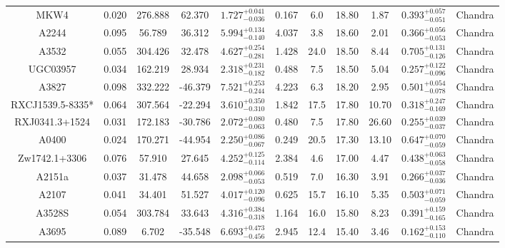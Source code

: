 \documentclass{aa}   %
\begin{document}
\begin{table}[h!]
\begin{center}
\begin{tabular}{ c  c  c  c c c c c c c c }
MKW4                		&		0.020	&	276.888	&	62.370	& $	1.727^{+0.041}_{-0.036}$  &      0.167	&  6.0	&	18.80	&	1.87	&	$ 0.393^{+0.057}_{-0.051}  $ &	  Chandra     \\
A2244               		&		0.095	&	56.789	&	36.312	& $	5.994^{+0.134}_{-0.140}$  &      4.037	&  3.8	&	18.60	&	2.01	&	$ 0.366^{+0.056}_{-0.053}  $ &	  Chandra     \\
A3532               		&		0.055	&	304.426	&	32.478	& $	4.627^{+0.254}_{-0.281}$  &      1.428	&  24.0	&	18.50	&	8.44	&	$ 0.705^{+0.131}_{-0.126}  $ &	 Chandra      \\
UGC03957            		&		0.034	&	162.219	&	28.934	& $	2.318^{+0.231}_{-0.182}$  &      0.488	&  7.5	&	18.50	&	5.04	&	$ 0.257^{+0.122}_{-0.096}  $ &	  Chandra     \\
A3827               		&		0.098	&	332.222	&	-46.379	& $	7.521^{+0.253}_{-0.244}$  &      4.223	&  6.3	&	18.20	&	2.95	&	$ 0.501^{+0.054}_{-0.078}  $ &	  Chandra     \\
RXCJ1539.5-8335*    		&		0.064	&	307.564	&	-22.294	& $	3.610^{+0.350}_{-0.310}$  &      1.842	&  17.5	&	17.80	&	10.70	&	$ 0.318^{+0.247}_{-0.169}  $ &	 Chandra      \\
RXJ0341.3+1524      		&		0.031	&	172.183	&	-30.786	& $	2.072^{+0.080}_{-0.063}$  &      0.480	&  7.5	&	17.80	&	26.60	&	$ 0.255^{+0.039}_{-0.037}  $ &	 Chandra      \\
A0400               		&		0.024	&	170.271	&	-44.954	& $	2.250^{+0.086}_{-0.067}$  &      0.249	&  20.5	&	17.30	&	13.10	&	$ 0.647^{+0.070}_{-0.059}  $ &	 Chandra      \\
Zw1742.1+3306       		&		0.076	&	57.910	&	27.645	& $	4.252^{+0.125}_{-0.114}$  &      2.384	&  4.6	&	17.00   &	4.47	&	$ 0.438^{+0.063}_{-0.058}  $ &	  Chandra     \\
A2151a              		&		0.037	&	31.478	&	44.658	& $	2.098^{+0.066}_{-0.053}$  &      0.519	&  7.0	&	16.30	&	3.91	&	$ 0.266^{+0.037}_{-0.036}  $ &	  Chandra     \\
A2107               		&		0.041	&	34.401	&	51.527	& $	4.017^{+0.120}_{-0.096}$  &      0.625	&  15.7	&	16.10	&	5.35	&	$ 0.503^{+0.071}_{-0.059}  $ &	  Chandra     \\
A3528S              		&		0.054	&	303.784	&	33.643	& $	4.316^{+0.384}_{-0.318}$  &      1.164	&  16.0	&	15.80	&	8.23	&	$ 0.391^{+0.159}_{-0.165}  $ &	 Chandra      \\
A3695               		&		0.089	&	6.702	&	-35.548	& $	6.693^{+0.473}_{-0.456}$  &      2.945	&  12.4	&	15.40	&	3.46	&	$ 0.162^{+0.153}_{-0.110}  $ &	  Chandra     \\

\end{tabular}
\end{center}
\end{table}
\end{document}
